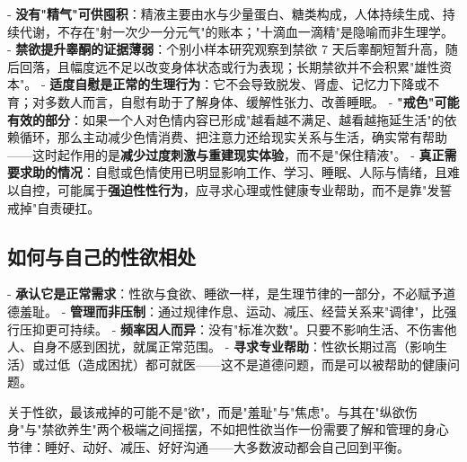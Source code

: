 - \textbf{没有"精气"可供囤积}：精液主要由水与少量蛋白、糖类构成，人体持续生成、持续代谢，不存在"射一次少一分元气"的账本；"十滴血一滴精"是隐喻而非生理学。
- \textbf{禁欲提升睾酮的证据薄弱}：个别小样本研究观察到禁欲 7 天后睾酮短暂升高，随后回落，且幅度远不足以改变身体状态或行为表现；长期禁欲并不会积累"雄性资本"。
- \textbf{适度自慰是正常的生理行为}：它不会导致脱发、肾虚、记忆力下降或不育；对多数人而言，自慰有助于了解身体、缓解性张力、改善睡眠。
- \textbf{"戒色"可能有效的部分}：如果一个人对色情内容已形成"越看越不满足、越看越拖延生活"的依赖循环，那么主动减少色情消费、把注意力还给现实关系与生活，确实常有帮助——这时起作用的是\textbf{减少过度刺激与重建现实体验}，而不是"保住精液"。
- \textbf{真正需要求助的情况}：自慰或色情使用已明显影响工作、学习、睡眠、人际与情绪，且难以自控，可能属于\textbf{强迫性性行为}，应寻求心理或性健康专业帮助，而不是靠"发誓戒掉"自责硬扛。

\subsection{如何与自己的性欲相处}

- \textbf{承认它是正常需求}：性欲与食欲、睡欲一样，是生理节律的一部分，不必赋予道德羞耻。
- \textbf{管理而非压制}：通过规律作息、运动、减压、经营关系来"调律"，比强行压抑更可持续。
- \textbf{频率因人而异}：没有"标准次数"。只要不影响生活、不伤害他人、自身不感到困扰，就属正常范围。
- \textbf{寻求专业帮助}：性欲长期过高（影响生活）或过低（造成困扰）都可就医——这不是道德问题，而是可以被帮助的健康问题。

\begin{tcolorbox}[colback=pink!5!white,colframe=red!50!black,title=贴心小叮咛]
关于性欲，最该戒掉的可能不是"欲"，而是"羞耻"与"焦虑"。与其在"纵欲伤身"与"禁欲养生"两个极端之间摇摆，不如把性欲当作一份需要了解和管理的身心节律：睡好、动好、减压、好好沟通——大多数波动都会自己回到平衡。
\end{tcolorbox}
